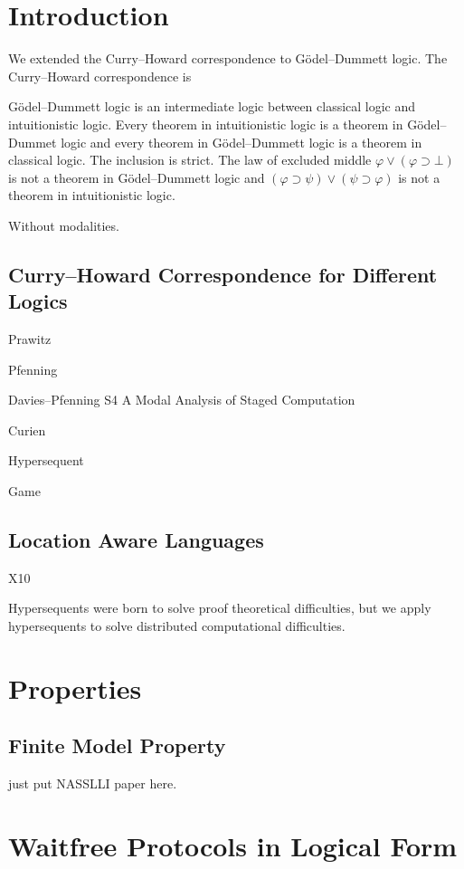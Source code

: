 \documentclass[doctor]{iscs-thesis}
\begin{document}
\chapter{Introduction}

We extended the Curry--Howard correspondence to G\"odel--Dummett logic.
The Curry--Howard correspondence is 

G\"odel--Dummett logic is an intermediate logic  between
classical logic and intuitionistic logic.  Every theorem in
intuitionistic logic is a theorem in G\"odel--Dummet logic and every
theorem in G\"odel--Dummett logic is a theorem in classical logic.
The inclusion is strict.  The law of excluded middle
$\varphi\vee(\varphi\supset \bot)$ is not a theorem in G\"odel--Dummett
logic and $(\varphi\supset\psi)\vee(\psi\supset\varphi)$ is not a
theorem in intuitionistic logic.

Without modalities.

\section{Curry--Howard Correspondence for Different Logics}

Prawitz

Pfenning

Davies--Pfenning S4 A Modal Analysis of Staged Computation
  
Curien

Hypersequent

Game

\section{Location Aware Languages}

X10


Hypersequents were born to solve proof theoretical difficulties, but we
apply hypersequents to solve distributed computational difficulties.

\chapter{Properties}

\section{Finite Model Property}

just put NASSLLI paper here.

\chapter{Waitfree Protocols in Logical Form}
\end{document}
